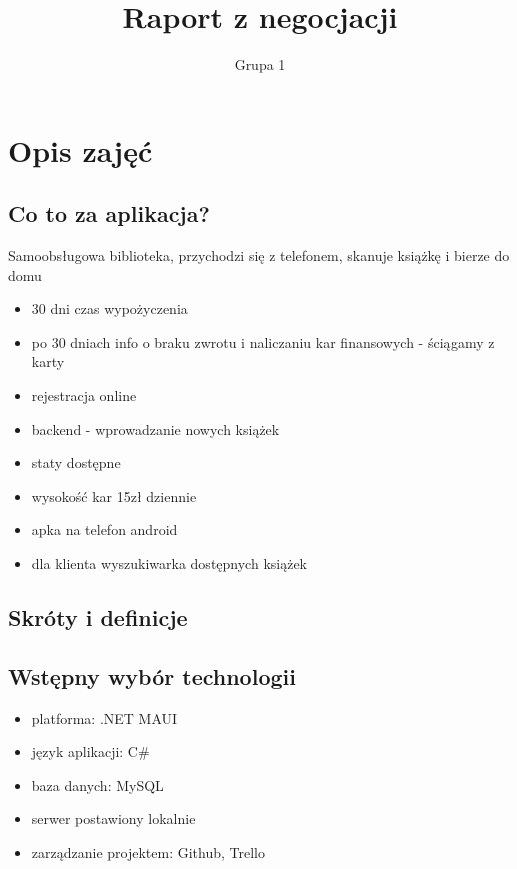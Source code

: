 \documentclass[]{report}
\title{Raport z negocjacji}
\author{Grupa 1}
\begin{document}
\maketitle
\tableofcontents
\newpage

\section{Opis zajęć}

\subsection{Co to za aplikacja?}



Samoobsługowa biblioteka, przychodzi się z telefonem, skanuje książkę i bierze do domu

\begin{itemize}

\item 30 dni czas wypożyczenia

\item po 30 dniach info o braku zwrotu i naliczaniu kar finansowych - ściągamy z karty


\item rejestracja online

\item backend - wprowadzanie nowych książek

\item staty dostępne

\item wysokość kar 15zł dziennie

\item apka na telefon android

\item dla klienta wyszukiwarka dostępnych książek

\end{itemize}


\subsection{Skróty i definicje}

\subsection{Wstępny wybór technologii}

\begin{itemize}

\item platforma: .NET MAUI

\item język aplikacji: C\#

\item baza danych: MySQL

\item serwer postawiony lokalnie

\item zarządzanie projektem: Github, Trello

\end{itemize}
\end{document}
